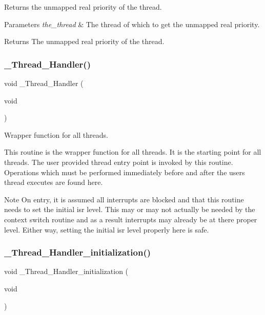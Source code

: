 Returns the unmapped real priority of the thread. 


\begin{DoxyParams}{Parameters}
{\em the\+\_\+thread} & The thread of which to get the unmapped real priority.\\
\hline
\end{DoxyParams}
\begin{DoxyReturn}{Returns}
The unmapped real priority of the thread. 
\end{DoxyReturn}
\mbox{\label{group__RTEMSScoreThread_gae0c3a615798c7cc70dc9ff6d9317df46}} 
\subsubsection{\texorpdfstring{\_Thread\_Handler()}{\_Thread\_Handler()}}
{\footnotesize\ttfamily void \+\_\+\+Thread\+\_\+\+Handler (\begin{DoxyParamCaption}\item[{void}]{ }\end{DoxyParamCaption})}



Wrapper function for all threads. 

This routine is the wrapper function for all threads. It is the starting point for all threads. The user provided thread entry point is invoked by this routine. Operations which must be performed immediately before and after the user\textquotesingle{}s thread executes are found here.

\begin{DoxyNote}{Note}
On entry, it is assumed all interrupts are blocked and that this routine needs to set the initial isr level. This may or may not actually be needed by the context switch routine and as a result interrupts may already be at there proper level. Either way, setting the initial isr level properly here is safe. 
\end{DoxyNote}
\mbox{\label{group__RTEMSScoreThread_ga439268e164b067a866d2901085c8c672}} 
\subsubsection{\texorpdfstring{\_Thread\_Handler\_initialization()}{\_Thread\_Handler\_initialization()}}
{\footnotesize\ttfamily void \+\_\+\+Thread\+\_\+\+Handler\+\_\+initialization (\begin{DoxyParamCaption}\item[{void}]{ }\end{DoxyParamCaption})}



